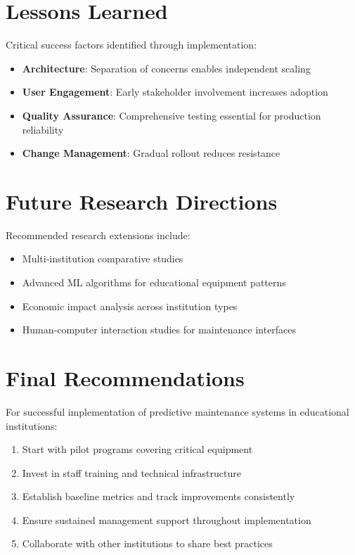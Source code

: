 \documentclass[12pt,a4paper]{report}
\begin{document}
\section{Lessons Learned}

Critical success factors identified through implementation:

\begin{itemize}
    \item \textbf{Architecture}: Separation of concerns enables independent scaling
    \item \textbf{User Engagement}: Early stakeholder involvement increases adoption
    \item \textbf{Quality Assurance}: Comprehensive testing essential for production reliability
    \item \textbf{Change Management}: Gradual rollout reduces resistance
\end{itemize}

\section{Future Research Directions}

Recommended research extensions include:

\begin{itemize}
    \item Multi-institution comparative studies
    \item Advanced ML algorithms for educational equipment patterns  
    \item Economic impact analysis across institution types
    \item Human-computer interaction studies for maintenance interfaces
\end{itemize}

\section{Final Recommendations}

For successful implementation of predictive maintenance systems in educational institutions:

\begin{enumerate}
    \item Start with pilot programs covering critical equipment
    \item Invest in staff training and technical infrastructure
    \item Establish baseline metrics and track improvements consistently
    \item Ensure sustained management support throughout implementation
    \item Collaborate with other institutions to share best practices
\end{enumerate}
\end{document}
